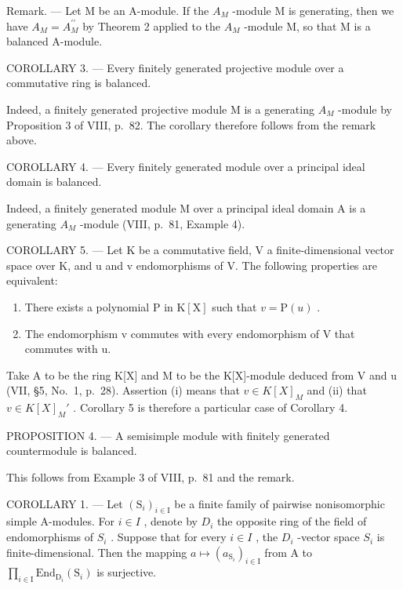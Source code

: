 Remark. --- Let M be an A-module. If the \(A_{M}\) -module M is generating, then we have \(A_{M} = A_{M}^{\prime\prime}\) by Theorem 2 applied to the \(A_{M}\) -module M, so that M is a balanced A-module.

COROLLARY 3. --- Every finitely generated projective module over a commutative ring is balanced.

Indeed, a finitely generated projective module M is a generating \(A_{M}\) -module by Proposition 3 of VIII, p.~82. The corollary therefore follows from the remark above.

COROLLARY 4. --- Every finitely generated module over a principal ideal domain is balanced.

Indeed, a finitely generated module M over a principal ideal domain A is a generating \(A_{M}\) -module (VIII, p.~81, Example 4).

COROLLARY 5. --- Let K be a commutative field, V a finite-dimensional vector space over K, and u and v endomorphisms of V. The following properties are equivalent:

\begin{enumerate}
\def\labelenumi{(\roman{enumi})}
\item
  There exists a polynomial \(\mathrm{P}\) in \(\mathrm{K}[\mathrm{X}]\) such that \(v = \mathrm{P}(u)\) .
\item
  The endomorphism v commutes with every endomorphism of V that commutes with u.
\end{enumerate}

Take A to be the ring K{[}X{]} and M to be the K{[}X{]}-module deduced from V and u (VII, §5, No.~1, p.~28). Assertion (i) means that \(v \in K[X]_{M}\) and (ii) that \(v \in K[X]_{M}'\) . Corollary 5 is therefore a particular case of Corollary 4.

PROPOSITION 4. --- A semisimple module with finitely generated countermodule is balanced.

This follows from Example 3 of VIII, p.~81 and the remark.

COROLLARY 1. --- Let \((\mathrm{S}_{i})_{i\in\mathrm{I}}\) be a finite family of pairwise nonisomorphic simple A-modules. For \(i\in I\) , denote by \(D_{i}\) the opposite ring of the field of endomorphisms of \(S_{i}\) . Suppose that for every \(i\in I\) , the \(D_{i}\) -vector space \(S_{i}\) is finite-dimensional. Then the mapping \(a \mapsto (a_{\mathrm{S}_i})_{i \in \mathrm{I}}\) from A to \(\prod_{i \in \mathrm{I}} \mathrm{End}_{\mathrm{D}_i}(\mathrm{S}_i)\) is surjective.

